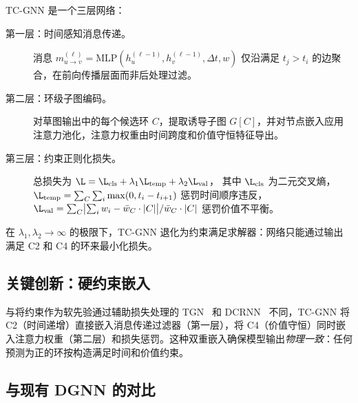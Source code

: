 \documentclass[journal,onecolumn]{IEEEtran}
\begin{document}
\textsc{TC-GNN} 是一个三层网络：

\begin{description}
\item[第一层：时间感知消息传递。] 消息 $m_{u \to v}^{(\ell)} = \mathrm{MLP}(h_u^{(\ell-1)}, h_v^{(\ell-1)}, \Delta t, w)$ 仅沿满足 $t_j > t_i$ 的边聚合，在前向传播层面而非后处理过滤。

\item[第二层：环级子图编码。] 对草图输出中的每个候选环 $C$，提取诱导子图 $G[C]$，并对节点嵌入应用注意力池化，注意力权重由时间跨度和价值守恒特征导出。

\item[第三层：约束正则化损失。] 总损失为
$\L = \L_{\mathrm{cls}} + \lambda_1 \L_{\mathrm{temp}} + \lambda_2 \L_{\mathrm{val}}$，
其中 $\L_{\mathrm{cls}}$ 为二元交叉熵，
$\L_{\mathrm{temp}} = \sum_C \sum_i \max(0, t_i - t_{i+1})$ 惩罚时间顺序违反，
$\L_{\mathrm{val}} = \sum_C \bigl|\sum_i w_i - \bar{w}_C \cdot |C|\bigr| / \bar{w}_C \cdot |C|$ 惩罚价值不平衡。
\end{description}

在 $\lambda_1, \lambda_2 \to \infty$ 的极限下，\textsc{TC-GNN} 退化为约束满足求解器：网络只能通过输出满足 C2 和 C4 的环来最小化损失。

\subsection{关键创新：硬约束嵌入}
\label{sec:model-hard}

与将约束作为软先验通过辅助损失处理的 \textsc{TGN}~\cite{tgn2020} 和 \textsc{DCRNN}~\cite{dcrnn2018} 不同，TC-GNN 将 C2（时间递增）直接嵌入消息传递过滤器（第一层），将 C4（价值守恒）同时嵌入注意力权重（第二层）和损失惩罚。这种双重嵌入确保模型输出\emph{物理一致}：任何预测为正的环按构造满足时间和价值约束。

\subsection{与现有 DGNN 的对比}
\label{sec:model-vs}
\end{document}
